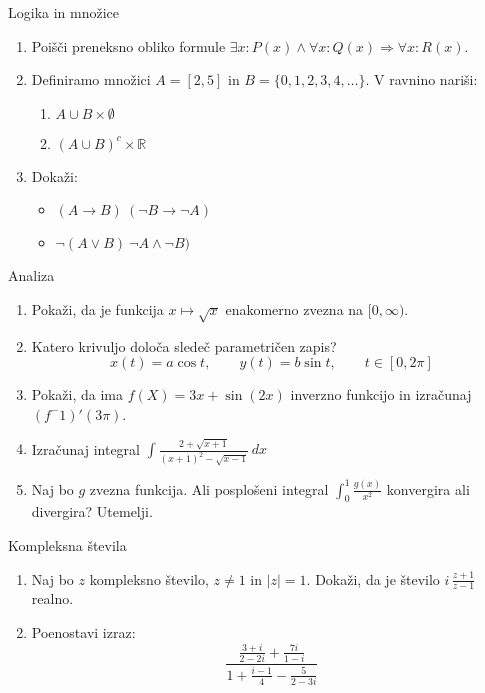 \begin{frame}{Logika in množice}
	\begin{enumerate}
		\item
		Poišči preneksno obliko formule $\exists x: P(x) \land \forall x : Q(x) \Rightarrow \forall x : R(x)$.
		\item 
		Definiramo množici $A=[2,5]$ in $B=\{0,1,2,3,4,\dots\}$.
		V ravnino nariši:
		\begin{enumerate}
		   \item $A \cup B \times \emptyset$
		   \item $(A \cup B)^c \times \mathbb{R}$
		\end{enumerate}
		\item
		Dokaži:
		\begin{itemize}
			\item $(A \rightarrow B) ~ (\neg B \rightarrow \neg A)$
			\item $\neg (A \vee B) ~ \neg A \wedge \neg B)$
		\end{itemize}
	\end{enumerate}
\end{frame}

\begin{frame}{Analiza}
	\begin{enumerate}
		\item
		Pokaži, da je funkcija $x \mapsto \sqrt{x}$ enakomerno zvezna na $[0,\infty)$.
		\item 
		Katero krivuljo določa sledeč parametričen zapis?
		$$
		   x(t) = a \cos t,\qquad  %
		   y(t) = b \sin t,\qquad %
		   t \in [0, 2 \pi]
		$$ 
		\item
		Pokaži, da ima $f(X) = 3x + \sin(2x)$ inverzno funkcijo in izračunaj $(f^-1)'(3\pi)$.
		
		\item
		Izračunaj integral 
		$\displaystyle \int \frac{2 + \sqrt{x+1}}{(x+1)^2 - \sqrt{x-1}}\,dx$
		\item 
		Naj bo $g$ zvezna funkcija. Ali posplošeni integral 
		$\int_{0}^{1}\frac{g(x)}{x^2}$
		konvergira ali divergira? Utemelji.
	\end{enumerate}
\end{frame}

\begin{frame}{Kompleksna števila}
	\begin{enumerate}
		\item
		Naj bo $z$ kompleksno število, $z \ne 1$ in $|z| = 1$.
		Dokaži, da je število \( i \, \frac{z+1}{z-1} \) realno.
		\item
		Poenostavi izraz:
		\LARGE \[\frac{\frac{3+i}{2-2i} + \frac{7i}{1-i}}{1 + \frac{i-1}{4} - \frac{5}{2-3i}}\]
	\end{enumerate}
\end{frame}